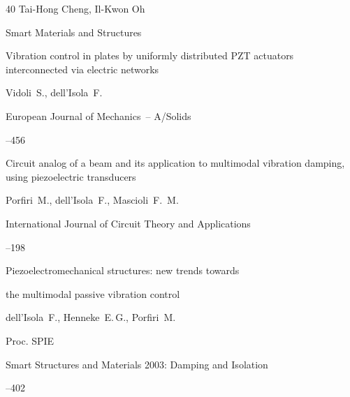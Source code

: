 \begin{thebibliography}{40}
\by Tai-Hong Cheng, Il-Kwon Oh

\jour Smart Materials and Structures









\paper Vibration control in plates by uniformly distributed PZT actuators interconnected via electric networks

\by Vidoli~S., dell'Isola~F.

\jour  European Journal of Mechanics~-- A/Solids 




--456





\paper Circuit analog of a beam and its application to multimodal vibration damping, using piezoelectric transducers

\by Porfiri~M., dell'Isola~F., Mascioli~F.~M.

\jour International Journal of Circuit Theory and Applications 




--198





\paper Piezoelectromechanical structures: new trends towards

the multimodal passive vibration control

\by dell'Isola~F., Henneke~E.\,G., Porfiri~M.

\jour Proc. SPIE 


\volinfo Smart Structures and Materials 2003: Damping and Isolation


--402





\end{thebibliography}
